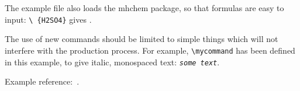 \documentclass[
journal=jacsat, %
manuscript=article]{achemso}
\newcommand*{\mycommand}[1]{\texttt{\emph{#1}}}
\begin{document}
The example file also loads the \textsf{mhchem} package, so
that formulas are easy to input: \texttt{\textbackslash
\ce\{H2SO4\}} gives .

The use of new commands should be limited to simple things which will
not interfere with the production process.  For example,
\texttt{\textbackslash mycommand} has been defined in this example,
to give italic, monospaced text: \mycommand{some text}.

Example reference:~\cite{Einstein}.













\end{document}
